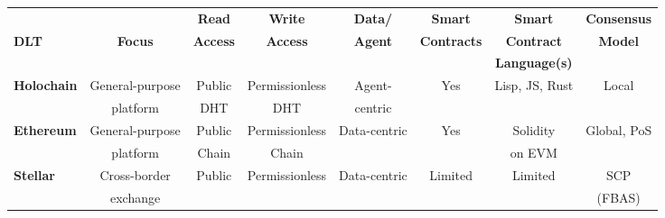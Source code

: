 \begin{table}
\vspace{-0.3cm}
\small
\begin{centering}
{\begin{tabular}{| l | c | c | c | c | c | c | c |}
\hline
				& 				& \textbf{Read}			& \textbf{Write}		& \textbf{Data/} 
				& \textbf{Smart}		& \textbf{Smart}			&\textbf{Consensus}\\
\textbf{DLT}		&\textbf{Focus}  	& \textbf{Access} 		& \textbf{Access}	& \textbf{Agent} 
				& \textbf{Contracts} 	& \textbf{Contract}		&\textbf{Model} \\
				& 				& \textbf{} 				& \textbf{} 			& \textbf{} 
				& \textbf{} 			& \textbf{Language(s)}	&\textbf{}  \\
\hline
\hline
\textbf{Holochain}	&General-purpose 			&Public		&Permissionless	&Agent-	&Yes		&Lisp, JS, Rust
				&Local 				\\
				&platform 					&DHT		&DHT			&centric	&		&
				& 					\\
\hline
\textbf{Ethereum}	&General-purpose		&Public		&Permissionless	&Data-centric	&Yes		&Solidity	
				&Global, PoS 			 \\
				&platform 				&Chain		&Chain			&			&		&on EVM	
				& 					 \\
\hline
\textbf{Stellar}		&Cross-border 					&Public		&Permissionless	&Data-centric	&Limited	&Limited
				&SCP 				\\
				&exchange 					&			&				&			&		&
				&(FBAS)				\\
\hline


\end{tabular}}
\end{centering}
\end{table}
